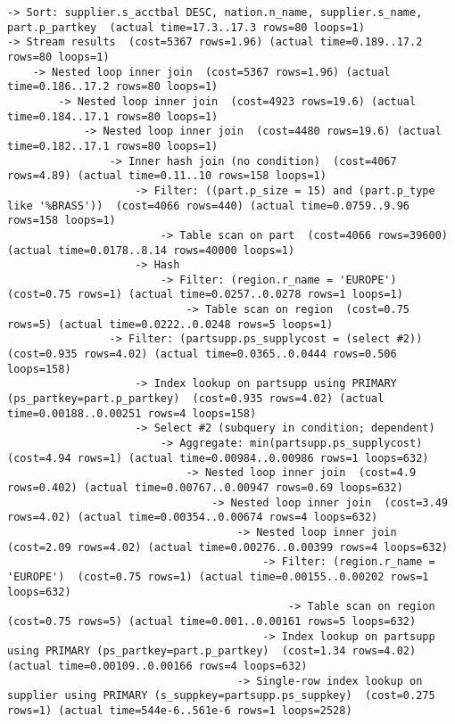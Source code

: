 \documentclass{article}
\begin{document}
\begin{lstlisting}
-> Sort: supplier.s_acctbal DESC, nation.n_name, supplier.s_name, part.p_partkey  (actual time=17.3..17.3 rows=80 loops=1)
-> Stream results  (cost=5367 rows=1.96) (actual time=0.189..17.2 rows=80 loops=1)
    -> Nested loop inner join  (cost=5367 rows=1.96) (actual time=0.186..17.2 rows=80 loops=1)
        -> Nested loop inner join  (cost=4923 rows=19.6) (actual time=0.184..17.1 rows=80 loops=1)
            -> Nested loop inner join  (cost=4480 rows=19.6) (actual time=0.182..17.1 rows=80 loops=1)
                -> Inner hash join (no condition)  (cost=4067 rows=4.89) (actual time=0.11..10 rows=158 loops=1)
                    -> Filter: ((part.p_size = 15) and (part.p_type like '%BRASS'))  (cost=4066 rows=440) (actual time=0.0759..9.96 rows=158 loops=1)
                        -> Table scan on part  (cost=4066 rows=39600) (actual time=0.0178..8.14 rows=40000 loops=1)
                    -> Hash
                        -> Filter: (region.r_name = 'EUROPE')  (cost=0.75 rows=1) (actual time=0.0257..0.0278 rows=1 loops=1)
                            -> Table scan on region  (cost=0.75 rows=5) (actual time=0.0222..0.0248 rows=5 loops=1)
                -> Filter: (partsupp.ps_supplycost = (select #2))  (cost=0.935 rows=4.02) (actual time=0.0365..0.0444 rows=0.506 loops=158)
                    -> Index lookup on partsupp using PRIMARY (ps_partkey=part.p_partkey)  (cost=0.935 rows=4.02) (actual time=0.00188..0.00251 rows=4 loops=158)
                    -> Select #2 (subquery in condition; dependent)
                        -> Aggregate: min(partsupp.ps_supplycost)  (cost=4.94 rows=1) (actual time=0.00984..0.00986 rows=1 loops=632)
                            -> Nested loop inner join  (cost=4.9 rows=0.402) (actual time=0.00767..0.00947 rows=0.69 loops=632)
                                -> Nested loop inner join  (cost=3.49 rows=4.02) (actual time=0.00354..0.00674 rows=4 loops=632)
                                    -> Nested loop inner join  (cost=2.09 rows=4.02) (actual time=0.00276..0.00399 rows=4 loops=632)
                                        -> Filter: (region.r_name = 'EUROPE')  (cost=0.75 rows=1) (actual time=0.00155..0.00202 rows=1 loops=632)
                                            -> Table scan on region  (cost=0.75 rows=5) (actual time=0.001..0.00161 rows=5 loops=632)
                                        -> Index lookup on partsupp using PRIMARY (ps_partkey=part.p_partkey)  (cost=1.34 rows=4.02) (actual time=0.00109..0.00166 rows=4 loops=632)
                                    -> Single-row index lookup on supplier using PRIMARY (s_suppkey=partsupp.ps_suppkey)  (cost=0.275 rows=1) (actual time=544e-6..561e-6 rows=1 loops=2528)

\end{lstlisting}
\end{document}
